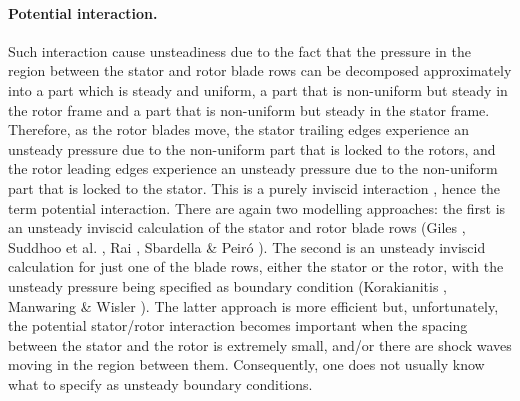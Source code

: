 \paragraph{Potential interaction.}
%
 Such interaction cause
 unsteadiness due to the fact that the pressure in the region between
 the stator and rotor blade rows can be decomposed approximately
 into a part which is steady and uniform, a part that is
 non-uniform but steady in the rotor frame and a part that is
 non-uniform but steady in the stator frame. Therefore, as the rotor
 blades move, the stator trailing edges experience an unsteady
 pressure due to the non-uniform part that is locked to the rotors,
 and the rotor leading edges experience an unsteady pressure due to the
 non-uniform part that is locked to the stator.
 This is a purely inviscid interaction , hence the term potential interaction.
 There are again two modelling approaches:
 the first is an unsteady inviscid calculation of the stator and rotor
 blade rows (Giles , Suddhoo et al. ,
 Rai , Sbardella \& Peir\'{o} ).
 The second is an unsteady inviscid calculation for just
 one of the blade rows, either the stator or the rotor, with the
 unsteady pressure being specified as boundary condition
 (Korakianitis ,
 Manwaring \& Wisler ).
 The latter approach is more efficient but, unfortunately, the
 potential stator/rotor interaction becomes important
 when the spacing between the stator and the rotor is extremely small,
 and/or there are shock waves moving in the region between them.
 Consequently, one does not usually know what to specify
 as unsteady boundary conditions.
%
%
